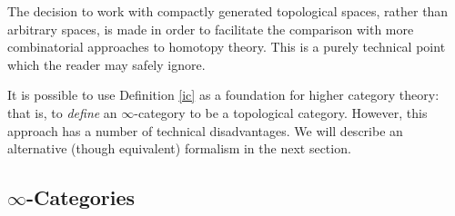 \begin{1.1.1 Goals and Obstacles}
\begin{remark}
The decision to work with compactly generated topological spaces,
rather than arbitrary spaces, is made in order to facilitate the comparison with more
combinatorial approaches to homotopy theory. This is a purely
technical point which the reader may safely ignore.
\end{remark}

It is possible to use Definition \ref{ic} as a foundation for higher category theory: that is, to {\em define} an $\infty$-category to be a topological category. However, this approach has a number of technical disadvantages. We will describe an alternative (though equivalent) formalism in the next section.
\end{1.1.1 Goals and Obstacles}
\subsection{$\infty$-Categories}\label{qqqc}
